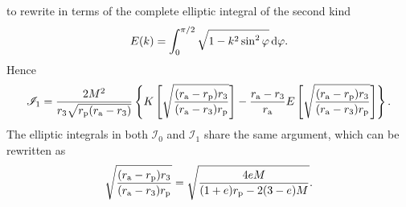 to rewrite in terms of the complete elliptic integral of the second kind
\begin{equation}
E(k) = \int_{0}^{\pi/2}{\sqrt{1 - k^2 \sin^2\varphi}}\,\mathrm{d}{\varphi}.
\end{equation}
Hence
\begin{equation}
\mathscr{I}_1 = \dfrac{2M^2}{r_3\sqrt{r_\mathrm{p}(r_\mathrm{a} - r_3)}}\left\{K\left[\sqrt{\dfrac{(r_\mathrm{a} - r_\mathrm{p})r_3}{(r_\mathrm{a} - r_3)r_\mathrm{p}}}\right] - \dfrac{r_\mathrm{a} - r_3}{r_\mathrm{a}}E\left[\sqrt{\dfrac{(r_\mathrm{a} - r_\mathrm{p})r_3}{(r_\mathrm{a} - r_3)r_\mathrm{p}}}\right]\right\}.
\end{equation}
The elliptic integrals in both $\mathscr{I}_0$ and $\mathscr{I}_1$ share the same argument, which can be rewritten as
\begin{equation}
\sqrt{\dfrac{(r_\mathrm{a} - r_\mathrm{p})r_3}{(r_\mathrm{a} - r_3)r_\mathrm{p}}} = \sqrt{\dfrac{4 e M}{(1+e) r_\mathrm{p} - 2(3 - e)M}}.
\end{equation}

